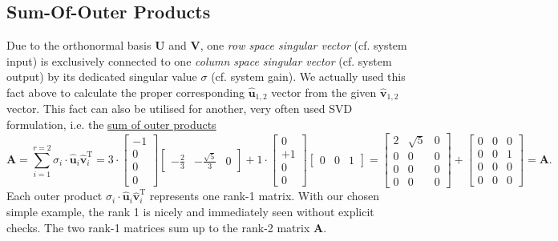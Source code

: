 \documentclass[a4paper, 11pt]{scrartcl}
\begin{document}
\subsection{Sum-Of-Outer Products}
Due to the orthonormal basis $\bm{U}$ and $\bm{V}$,
one \textit{row space singular vector} (cf. system input)
is exclusively connected to one \textit{column space singular vector} (cf. system output)
by its dedicated singular value $\sigma$ (cf. system gain).
We actually used this fact above to calculate the proper corresponding $\hat{\bm{u}}_{1,2}$ vector from the given $\hat{\bm{v}}_{1,2}$ vector. This fact can also be utilised for another, very often used SVD formulation, i.e. the \underline{sum of outer products}
$$
\bm{A} = \sum_{i=1}^{r=2} \sigma_i \cdot \hat{\bm{u}}_i \hat{\bm{v}}_i^\mathrm{T}=
3\cdot
\begin{bmatrix}
-1\\0\\0\\0
\end{bmatrix}
\begin{bmatrix}
-\frac{2}{3} & -\frac{\sqrt{5}}{3} & 0
\end{bmatrix}
+
1\cdot
\begin{bmatrix}
0\\+1\\0\\0
\end{bmatrix}
\begin{bmatrix}
0 & 0 & 1
\end{bmatrix}
=
\begin{bmatrix}
2 & \sqrt{5} & 0\\
0 & 0 & 0\\
0 & 0 & 0\\
0 & 0 & 0
\end{bmatrix}+
\begin{bmatrix}
0 & 0 & 0\\
0 & 0 & 1\\
0 & 0 & 0\\
0 & 0 & 0
\end{bmatrix}
=\bm{A}.
$$
Each outer product $\sigma_i \cdot \hat{\bm{u}}_i \hat{\bm{v}}_i^\mathrm{T}$ represents one rank-1 matrix. With our chosen simple example, the rank 1 is nicely and immediately seen without explicit checks. The two rank-1 matrices sum up to the rank-2 matrix $\bm{A}$.
\end{document}
